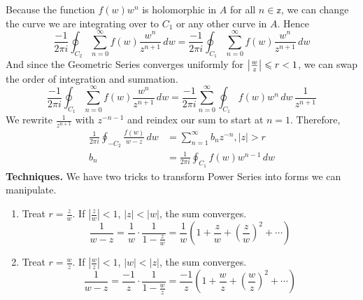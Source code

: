 \documentclass[11pt]{article}
\DeclarePairedDelimiter\abs{\lvert}{\rvert}
\begin{document}
Because the function $f(w)w^n$ is holomorphic in $A$ for all $n \in \mathbb{z}$, we can change the curve we are integrating over to $C_1$ or any other curve in $A$. Hence 
$$\frac{-1}{2\pi i}\oint_{C_2}\sum_{n = 0}^{\infty} f(w)\frac{w^n}{z^{n + 1}} \, dw = \frac{-1}{2\pi i}\oint_{C_1}\sum_{n = 0}^{\infty} f(w)\frac{w^n}{z^{n + 1}} \, dw $$
And since the Geometric Series converges uniformly for $\abs*{\frac{w}{z}} \leqslant r < 1$, we can swap the order of integration and summation.
$$\frac{-1}{2\pi i}\oint_{C_1}\sum_{n = 0}^{\infty} f(w)\frac{w^n}{z^{n + 1}} \, dw = \frac{-1}{2\pi i}\sum_{n = 0}^{\infty}\oint_{C_1} f(w)w^n \, dw \, \frac{1}{z^{n + 1}}$$
We rewrite $\frac{1}{z^{n + 1}}$ with $z^{-n - 1}$ and reindex our sum to start at $n = 1$. Therefore, 
\begin{align*}
\frac{1}{2\pi i}\oint_{-C_2}\frac{f(w)}{w - z} \,dw &= \sum_{n = 1}^{\infty} b_n z^{-n}, |z| > r \\
b_n &= \frac{1}{2\pi i}\oint_{C_1}f(w)w^{n - 1}\, dw 
\end{align*}
\newline
\textbf{Techniques.}
 We have two tricks to transform Power Series into forms we can manipulate. 
\begin{enumerate}
\item Treat $r = \frac{z}{w}$. If $|\frac{z}{w}| < 1$, $|z| < |w|$, the sum converges. 
$$\frac{1}{w - z} = \frac{1}{w}\cdot \frac{1}{1 - \frac{z}{w}} = \frac{1}{w}\left(1 + \frac{z}{w} + \left(\frac{z}{w}\right)^2+\cdots \right)$$
\item Treat $r = \frac{w}{z}$. If $|\frac{w}{z}| < 1$, $|w| < |z|$, the sum converges. 
$$\frac{1}{w - z} = \frac{-1}{z}\cdot \frac{1}{1 - \frac{w}{z}} = \frac{-1}{z}\left(1 + \frac{w}{z} + \left(\frac{w}{z}\right)^2+\cdots \right)$$
\end{enumerate}
\end{document}
